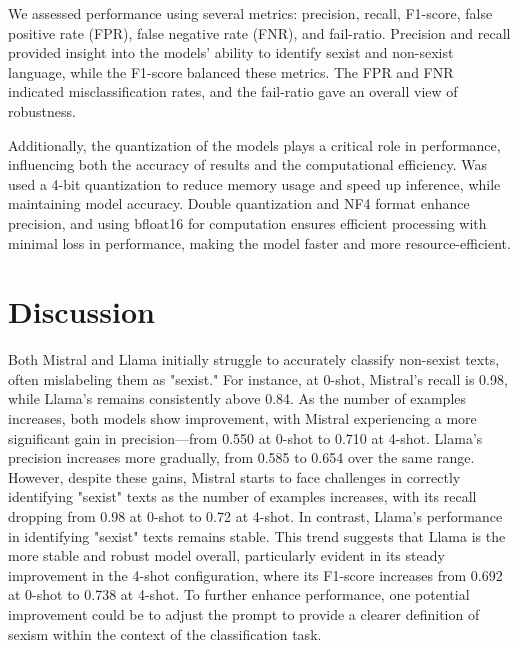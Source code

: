 \documentclass[11pt]{article}
\begin{document}
We assessed performance using several metrics: precision, recall, F1-score, false positive rate (FPR), false negative rate (FNR), and fail-ratio. Precision and recall provided insight into the models’ ability to identify sexist and non-sexist language, while the F1-score balanced these metrics. The FPR and FNR indicated misclassification rates, and the fail-ratio gave an overall view of robustness.

Additionally, the quantization of the models plays a critical role in performance, influencing both the accuracy of results and the computational efficiency. Was used a 4-bit quantization to reduce memory usage and speed up inference, while maintaining model accuracy. Double quantization and NF4 format enhance precision, and using bfloat16 for computation ensures efficient processing with minimal loss in performance, making the model faster and more resource-efficient.



\section{Discussion}
\label{sec:discussion}

Both Mistral and Llama initially struggle to accurately classify non-sexist texts, often mislabeling them as "sexist." For instance, at 0-shot, Mistral's recall is 0.98, while Llama's remains consistently above 0.84. As the number of examples increases, both models show improvement, with Mistral experiencing a more significant gain in precision—from 0.550 at 0-shot to 0.710 at 4-shot. Llama's precision increases more gradually, from 0.585 to 0.654 over the same range. However, despite these gains, Mistral starts to face challenges in correctly identifying "sexist" texts as the number of examples increases, with its recall dropping from 0.98 at 0-shot to 0.72 at 4-shot. In contrast, Llama's performance in identifying "sexist" texts remains stable. This trend suggests that Llama is the more stable and robust model overall, particularly evident in its steady improvement in the 4-shot configuration, where its F1-score increases from 0.692 at 0-shot to 0.738 at 4-shot. To further enhance performance, one potential improvement could be to adjust the prompt to provide a clearer definition of sexism within the context of the classification task.
\end{document}
